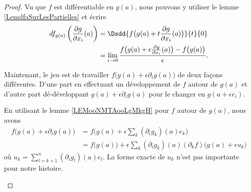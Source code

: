 \begin{proof}
	Vu que \( f\) est différentiable en \( g(a)\), nous pouvons y utiliser le lemme \ref{LemdfaSurLesPartielles} et écrire
	\begin{subequations}   \label{EQooFZBVooTwNexc}
		\begin{align}
			df_{g(a)}\left( \frac{ \partial g }{ \partial x_i }(a) \right) & =\Dsdd{ f\big( g(a)+t\frac{ \partial g }{ \partial x_i }(a) \big) }{t}{0}                                                     \\
			                                                               & =\lim_{\epsilon\to 0}\frac{ f\big( g(a)+\epsilon\frac{ \partial g }{ \partial x_i }(a) \big)-f\big( g(a) \big) }{ \epsilon }.
		\end{align}
	\end{subequations}

	Maintenant, le jeu est de travailler \( f\big( g(a)+\epsilon\partial_ig(a) \big)\) de deux façons différentes. D'une part en effectuant un développement de \( f\) autour de \( g(a)\) et d'autre part dé-développant \( g(a)+\epsilon\partial_ig(a)\) pour le changer en \( g(a+\epsilon e_i)\).

	\begin{subproof}
		\spitem[Développer \( f\)]
		En utilisant le lemme \ref{LEMooNMTAooLgMkgH} pour \( f\) autour de \( g(a)\), nous avons
		\begin{subequations}
			\begin{align}
				f\big( g(a)+\epsilon\partial_ig(a) \big) & =f\big( g(a)+\epsilon\sum_k(\partial_ig_k)(a)e_k \big)                                      \\
				                                         & =f\big( g(a) \big)+\epsilon\sum_k(\partial_ig_k)(a)(\partial_kf)\big(g(a)+\epsilon u_k\big)
			\end{align}
		\end{subequations}
		où \( u_k=\sum_{l=k+1}^n(\partial_ig_l)(a)e_l\). La forme exacte de \( u_k\) n'est pas importante pour notre histoire.


\end{subproof}
\end{proof}
